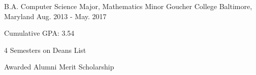 

\begin{cventries}

  \cventry
    {B.A. Computer Science Major, Mathematics Minor} %
    {Goucher College} %
    {Baltimore, Maryland} %
    {Aug. 2013 - May. 2017} %
    {
      \begin{cvitems} %
        \item {Cumulative GPA: 3.54}
        \item {4 Semesters on Deans List}
        \item {Awarded Alumni Merit Scholarship}
      \end{cvitems}
    }

\end{cventries}
